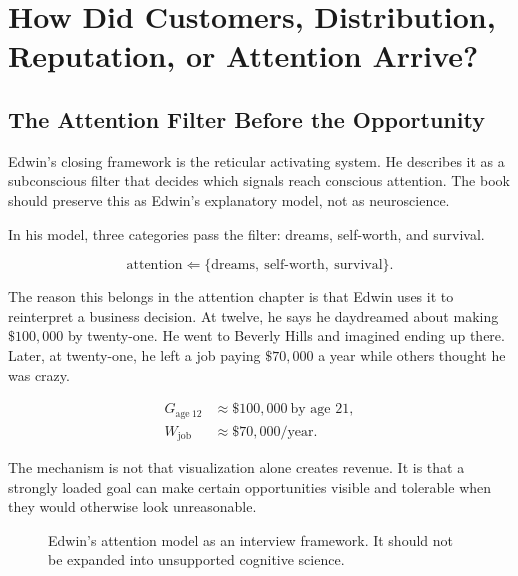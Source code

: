 \documentclass[11pt,oneside]{book}
\begin{document}
\chapter{How Did Customers, Distribution, Reputation, or Attention Arrive?}

\section{The Attention Filter Before the Opportunity}

Edwin's closing framework is the reticular activating system. He describes it as a subconscious filter that decides which signals reach conscious attention. The book should preserve this as Edwin's explanatory model, not as neuroscience.

In his model, three categories pass the filter: dreams, self-worth, and survival.

\begin{equation}
\mathrm{attention}
\Leftarrow
\{\mathrm{dreams},\ \mathrm{self\mbox{-}worth},\ \mathrm{survival}\}.
\end{equation}

The reason this belongs in the attention chapter is that Edwin uses it to reinterpret a business decision. At twelve, he says he daydreamed about making \(\$100{,}000\) by twenty-one. He went to Beverly Hills and imagined ending up there. Later, at twenty-one, he left a job paying \(\$70{,}000\) a year while others thought he was crazy.

\begin{align}
G_{\mathrm{age\ 12}} &\approx \$100{,}000\ \text{by age }21,\\
W_{\mathrm{job}} &\approx \$70{,}000/\text{year}.
\end{align}

The mechanism is not that visualization alone creates revenue. It is that a strongly loaded goal can make certain opportunities visible and tolerable when they would otherwise look unreasonable.

\begin{figure}
\centering
{}
\caption{Edwin's attention model as an interview framework. It should not be expanded into unsupported cognitive science.}
\end{figure}
\end{document}
